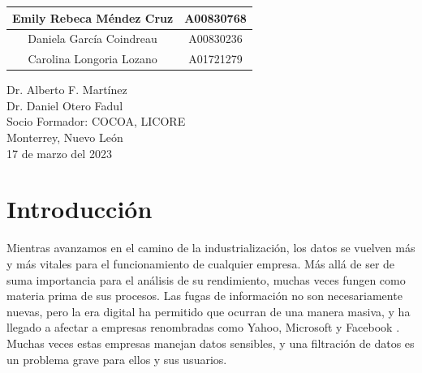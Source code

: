 \documentclass{article}
\begin{document}
\begin{titlepage}
\begin{center}
\begin{table}[h!]
\begin{tabular}{ ||c|c|| }
                    \hline
                    Emily Rebeca Méndez Cruz & A00830768 \\
                    \hline
                    Daniela García Coindreau & A00830236 \\
                    \hline
                    Carolina Longoria Lozano & A01721279 \\
                    \hline
                \end{tabular}
            \end{table}
            \vspace{0.7cm}
            \large 	Dr. Alberto F. Martínez \\ %
            \vspace{0.2cm}
            \large 	Dr. Daniel Otero Fadul\\ %
            \vspace{0.2cm}
            \large Socio Formador: COCOA, LICORE \\
            \vspace{0.2cm}
            \large Monterrey, Nuevo León \\
            \vspace{0.2cm}
            \large 17 de marzo del 2023 \\
            \vspace{1cm}
        \end{center}
    \end{titlepage}

    \tableofcontents
    \listoffigures
    \listoftables
    \clearpage
    \renewcommand{\tablename}{Tabla}

    \section{Introducción}

        Mientras avanzamos en el camino de la industrialización, los datos se vuelven más y más vitales para el funcionamiento de cualquier empresa. Más allá de ser de suma importancia para el análisis de su rendimiento, muchas veces fungen como materia prima de sus procesos. Las fugas de información no son necesariamente nuevas, pero la era digital ha permitido que ocurran de una manera masiva, y ha llegado a afectar a empresas renombradas como Yahoo, Microsoft y Facebook \cite{data_breach_biggest}. Muchas veces estas empresas manejan datos sensibles, y una filtración de datos es un problema grave para ellos y sus usuarios.
\end{document}
